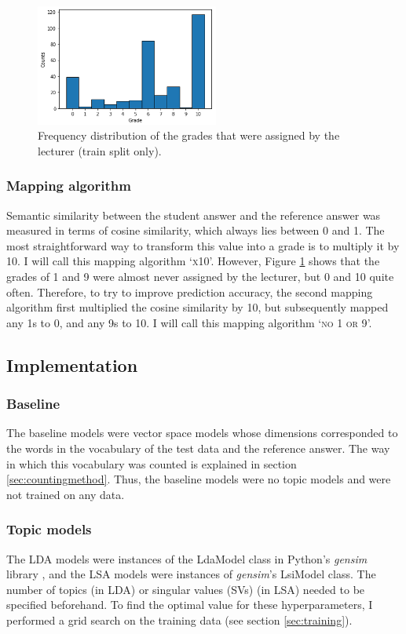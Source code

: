 \documentclass[a4paper,10pt,twoside]{article}
\begin{document}
\begin{figure}
	\vspace{-15pt}
	\includegraphics[width=6cm]{"Histogram of grades"}
	\caption{Frequency distribution of the grades that were assigned by the lecturer (train split only).}
	\label{fig:histogram}
	\vspace{-45pt}
\end{figure} 

\subsubsection{Mapping algorithm}
Semantic similarity between the student answer and the reference answer was measured in terms of cosine similarity, which always lies between 0 and 1. The most straightforward way to transform this value into a grade is to multiply it by 10. I will call this mapping algorithm `\textsc{x10}'. However, Figure \ref{fig:histogram} shows that the grades of 1 and 9 were almost never assigned by the lecturer, but 0 and 10 quite often. Therefore, to try to improve prediction accuracy, the second mapping algorithm first multiplied the cosine similarity by 10, but subsequently mapped any 1s to 0, and any 9s to 10. I will call this mapping algorithm `\textsc{no 1 or 9}'.

\subsection{Implementation}

\subsubsection{Baseline}
The baseline models were vector space models whose dimensions corresponded to the words in the vocabulary of the test data and the reference answer. The way in which this vocabulary was counted is explained in section \ref{sec:countingmethod}. Thus, the baseline models were no topic models and were not trained on any data.

\subsubsection{Topic models}
The LDA models were instances of the LdaModel class in Python's \textit{gensim} library \cite{rehurek2010}, and the LSA models were instances of \textit{gensim}'s LsiModel class. The number of topics (in LDA) or singular values (SVs) (in LSA) needed to be specified beforehand. To find the optimal value for these hyperparameters, I performed a grid search on the training data (see section \ref{sec:training}).
\end{document}
